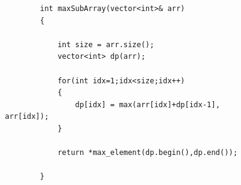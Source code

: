 \begin{solution}[Naive]
    \begin{figure}
    \begin{verbatim}
        int maxSubArray(vector<int>& arr) 
        {
            
            int size = arr.size();
            vector<int> dp(arr);
            
            for(int idx=1;idx<size;idx++)
            {
                dp[idx] = max(arr[idx]+dp[idx-1], arr[idx]);
            }

            return *max_element(dp.begin(),dp.end());
    
        }
    \end{verbatim}
\end{figure}

\end{solution}